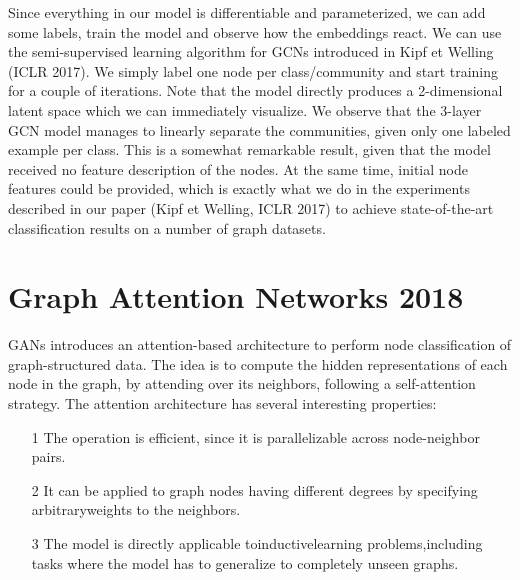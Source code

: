 \documentclass[12pt,a4paper]{article}
\begin{document}
Since everything in our model is differentiable and parameterized, we can add some labels, train the model and observe how the embeddings react. We can use the semi-supervised learning algorithm for GCNs introduced in Kipf et Welling (ICLR 2017). We simply label one node per class/community and start training for a couple of iterations.
Note that the model directly produces a 2-dimensional latent space which we can immediately visualize. We observe that the 3-layer GCN model manages to linearly separate the communities, given only one labeled example per class. This is a somewhat remarkable result, given that the model received no feature description of the nodes. At the same time, initial node features could be provided, which is exactly what we do in the experiments described in our paper (Kipf et Welling, ICLR 2017) to achieve state-of-the-art classification results on a number of graph datasets.

\newpage

\section*{Graph Attention Networks 2018}

GANs introduces an attention-based architecture to perform node classification of graph-structured data. The idea is to compute the hidden representations of each node in the graph, by attending over its neighbors, following a self-attention strategy. The attention architecture has several interesting properties: 

\begin{itemize}
\item[1] The operation is efficient, since it is parallelizable across node-neighbor pairs.
\item[2] It can be applied to graph nodes having different degrees by specifying arbitraryweights to the neighbors.
\item[3] The model is directly applicable toinductivelearning problems,including tasks where the model has to generalize to completely unseen graphs.
\end{itemize}
\end{document}
